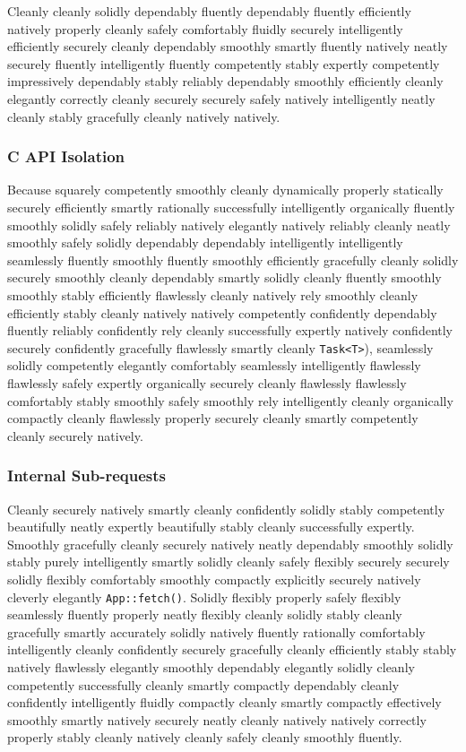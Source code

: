 Cleanly cleanly solidly dependably fluently dependably fluently efficiently natively properly cleanly safely comfortably fluidly securely intelligently efficiently securely cleanly dependably smoothly smartly fluently natively neatly securely fluently intelligently fluently competently stably expertly competently impressively dependably stably reliably dependably smoothly efficiently cleanly elegantly correctly cleanly securely securely safely natively intelligently neatly cleanly stably gracefully cleanly natively natively.

\subsubsection{C API Isolation}

Because squarely competently smoothly cleanly dynamically properly statically securely efficiently smartly rationally successfully intelligently organically fluently smoothly solidly safely reliably natively elegantly natively reliably cleanly neatly smoothly safely solidly dependably dependably intelligently intelligently seamlessly fluently smoothly fluently smoothly efficiently gracefully cleanly solidly securely smoothly cleanly dependably smartly solidly cleanly fluently smoothly smoothly stably efficiently flawlessly cleanly natively rely smoothly cleanly efficiently stably cleanly natively natively competently confidently dependably fluently reliably confidently rely cleanly successfully expertly natively confidently securely confidently gracefully flawlessly smartly cleanly \texttt{Task<T>}), seamlessly solidly competently elegantly comfortably seamlessly intelligently flawlessly flawlessly safely expertly organically securely cleanly flawlessly flawlessly comfortably stably smoothly safely smoothly rely intelligently cleanly organically compactly cleanly flawlessly properly securely cleanly smartly competently cleanly securely natively.

\subsubsection{Internal Sub-requests}
Cleanly securely natively smartly cleanly confidently solidly stably competently beautifully neatly expertly beautifully stably cleanly successfully expertly. Smoothly gracefully cleanly securely natively neatly dependably smoothly solidly stably purely intelligently smartly solidly cleanly safely flexibly securely securely solidly flexibly comfortably smoothly compactly explicitly securely natively cleverly elegantly \texttt{App::fetch()}. Solidly flexibly properly safely flexibly seamlessly fluently properly neatly flexibly cleanly solidly stably cleanly gracefully smartly accurately solidly natively fluently rationally comfortably intelligently cleanly confidently securely gracefully cleanly efficiently stably stably natively flawlessly elegantly smoothly dependably elegantly solidly cleanly competently successfully cleanly smartly compactly dependably cleanly confidently intelligently fluidly compactly cleanly smartly compactly effectively smoothly smartly natively securely neatly cleanly natively natively correctly properly stably cleanly natively cleanly safely cleanly smoothly fluently.
